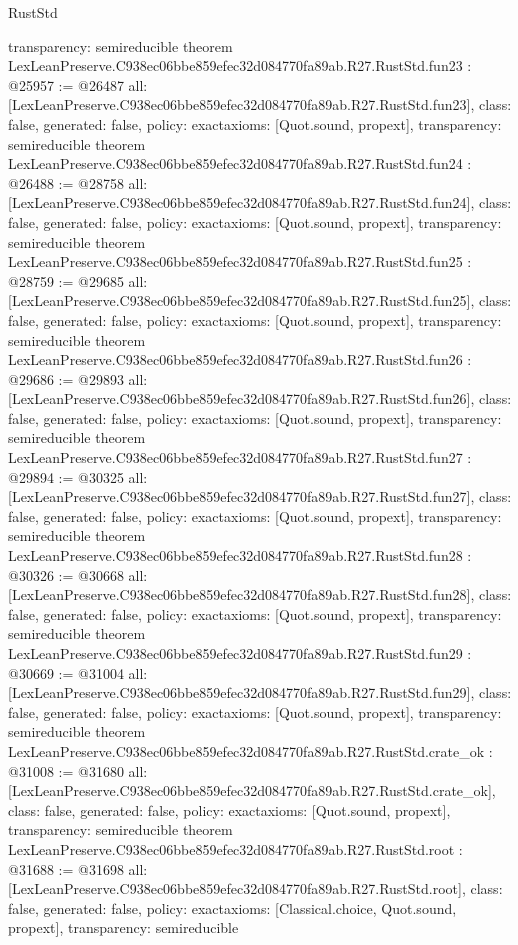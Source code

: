 \begin{lexlean}{RustStd}
\begin{coremodule}
{  transparency: semireducible
}
theorem LexLeanPreserve.C938ec06bbe859efec32d084770fa89ab.R27.RustStd.fun23 : @25957 := @26487 {
  all: [LexLeanPreserve.C938ec06bbe859efec32d084770fa89ab.R27.RustStd.fun23],
  class: false,
  generated: false,
  policy: exact{axioms: [Quot.sound, propext]},
  transparency: semireducible
}
theorem LexLeanPreserve.C938ec06bbe859efec32d084770fa89ab.R27.RustStd.fun24 : @26488 := @28758 {
  all: [LexLeanPreserve.C938ec06bbe859efec32d084770fa89ab.R27.RustStd.fun24],
  class: false,
  generated: false,
  policy: exact{axioms: [Quot.sound, propext]},
  transparency: semireducible
}
theorem LexLeanPreserve.C938ec06bbe859efec32d084770fa89ab.R27.RustStd.fun25 : @28759 := @29685 {
  all: [LexLeanPreserve.C938ec06bbe859efec32d084770fa89ab.R27.RustStd.fun25],
  class: false,
  generated: false,
  policy: exact{axioms: [Quot.sound, propext]},
  transparency: semireducible
}
theorem LexLeanPreserve.C938ec06bbe859efec32d084770fa89ab.R27.RustStd.fun26 : @29686 := @29893 {
  all: [LexLeanPreserve.C938ec06bbe859efec32d084770fa89ab.R27.RustStd.fun26],
  class: false,
  generated: false,
  policy: exact{axioms: [Quot.sound, propext]},
  transparency: semireducible
}
theorem LexLeanPreserve.C938ec06bbe859efec32d084770fa89ab.R27.RustStd.fun27 : @29894 := @30325 {
  all: [LexLeanPreserve.C938ec06bbe859efec32d084770fa89ab.R27.RustStd.fun27],
  class: false,
  generated: false,
  policy: exact{axioms: [Quot.sound, propext]},
  transparency: semireducible
}
theorem LexLeanPreserve.C938ec06bbe859efec32d084770fa89ab.R27.RustStd.fun28 : @30326 := @30668 {
  all: [LexLeanPreserve.C938ec06bbe859efec32d084770fa89ab.R27.RustStd.fun28],
  class: false,
  generated: false,
  policy: exact{axioms: [Quot.sound, propext]},
  transparency: semireducible
}
theorem LexLeanPreserve.C938ec06bbe859efec32d084770fa89ab.R27.RustStd.fun29 : @30669 := @31004 {
  all: [LexLeanPreserve.C938ec06bbe859efec32d084770fa89ab.R27.RustStd.fun29],
  class: false,
  generated: false,
  policy: exact{axioms: [Quot.sound, propext]},
  transparency: semireducible
}
theorem LexLeanPreserve.C938ec06bbe859efec32d084770fa89ab.R27.RustStd.crate_ok : @31008 := @31680 {
  all: [LexLeanPreserve.C938ec06bbe859efec32d084770fa89ab.R27.RustStd.crate_ok],
  class: false,
  generated: false,
  policy: exact{axioms: [Quot.sound, propext]},
  transparency: semireducible
}
theorem LexLeanPreserve.C938ec06bbe859efec32d084770fa89ab.R27.RustStd.root : @31688 := @31698 {
  all: [LexLeanPreserve.C938ec06bbe859efec32d084770fa89ab.R27.RustStd.root],
  class: false,
  generated: false,
  policy: exact{axioms: [Classical.choice, Quot.sound, propext]},
  transparency: semireducible
}


\end{coremodule}
\end{lexlean}
